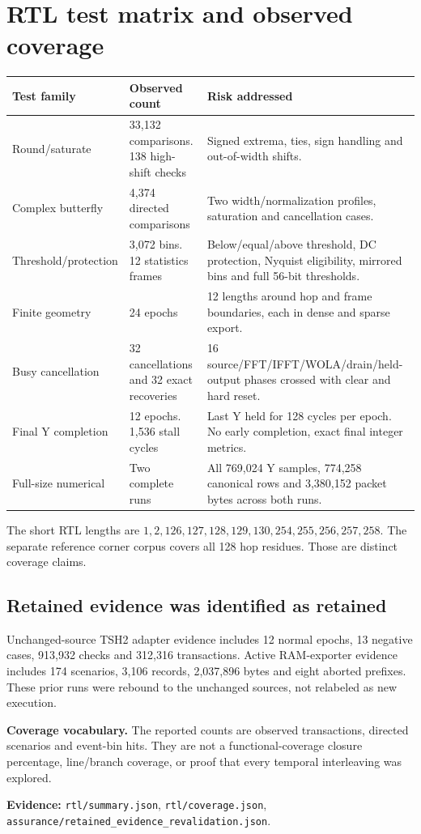 \documentclass[11pt,letterpaper]{article}
\newcommand{\page}[1]{\clearpage\section{#1}}
\newcommand{\evidence}[1]{\par{\footnotesize\raggedright\sloppy\color{muted}\textbf{Evidence:} #1\par}}
\newcommand{\epath}[1]{\nolinkurl{#1}}
\newcommand{\callout}[2]{\par\medskip\noindent\textbf{#1.} #2\par\smallskip}
\begin{document}
\page{RTL test matrix and observed coverage}
\par\noindent\begin{minipage}{\linewidth}
\noindent\begin{tabularx}{\linewidth}{P{1.65in}P{1.55in}L}
\toprule
\textbf{Test family} & \textbf{Observed count} & \textbf{Risk addressed}\\
\midrule
Round/saturate & 33,132 comparisons. 138 high-shift checks & Signed extrema, ties, sign handling and out-of-width shifts.\\
Complex butterfly & 4,374 directed comparisons & Two width/normalization profiles, saturation and cancellation cases.\\
Threshold/protection & 3,072 bins. 12 statistics frames & Below/equal/above threshold, DC protection, Nyquist eligibility, mirrored bins and full 56-bit thresholds.\\
Finite geometry & 24 epochs & 12 lengths around hop and frame boundaries, each in dense and sparse export.\\
Busy cancellation & 32 cancellations and 32 exact recoveries & 16 source/FFT/IFFT/WOLA/drain/held-output phases crossed with clear and hard reset.\\
Final Y completion & 12 epochs. 1,536 stall cycles & Last Y held for 128 cycles per epoch. No early completion, exact final integer metrics.\\
Full-size numerical & Two complete runs & All 769,024 Y samples, 774,258 canonical rows and 3,380,152 packet bytes across both runs.\\
\bottomrule
\end{tabularx}\par\end{minipage}\par
The short RTL lengths are $1,2,126,127,128,129,130,254,255,256,257,258$. The separate reference corner corpus covers all 128 hop residues. Those are distinct coverage claims.
\subsection{Retained evidence was identified as retained}
Unchanged-source TSH2 adapter evidence includes 12 normal epochs, 13 negative cases, 913,932 checks and 312,316 transactions. Active RAM-exporter evidence includes 174 scenarios, 3,106 records, 2,037,896 bytes and eight aborted prefixes. These prior runs were rebound to the unchanged sources, not relabeled as new execution.
\callout{Coverage vocabulary}{The reported counts are observed transactions, directed scenarios and event-bin hits. They are not a functional-coverage closure percentage, line/branch coverage, or proof that every temporal interleaving was explored.}
\evidence{\epath{rtl/summary.json}, \epath{rtl/coverage.json}, \epath{assurance/retained_evidence_revalidation.json}.}
\end{document}

